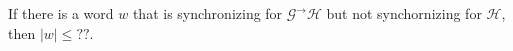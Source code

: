 \documentclass{article}
\newcommand{\Gc}{\mathcal{G}}  %
\newcommand{\Hc}{\mathcal{H}}  %
\newcommand{\Vc}{\mathcal{V}}
\newcommand{\Bc}{\mathcal{B}}
\newcommand{\GtH}{\Gc^\to\Hc}
\newcommand{\shift}[1]{\mathsf{X}_{#1}}
\theoremstyle{definition}
\begin{document}
\begin{theorem}
    If there is a word \(w\) that is synchronizing for \(\GtH\) but 
    not synchornizing for \(\Hc\), then \(|w| \leq ??\).
\end{theorem}









\end{document}
